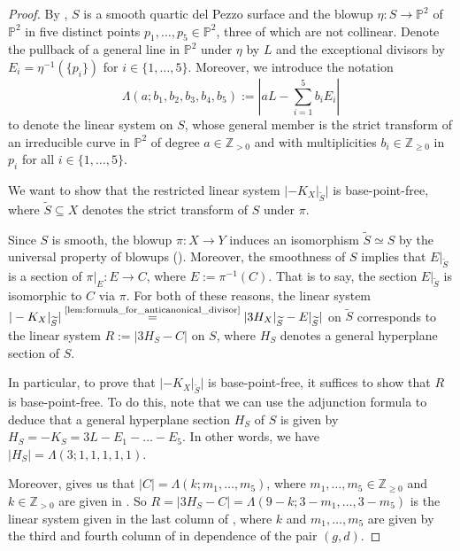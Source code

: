 \documentclass[english,11pt,reqno]{amsart}
\newcommand{\sub}{\subseteq}
\newcommand{\Ptwo}{\mathbb{P}^2}
\newcommand{\Z}{\mathbb{Z}}
\begin{document}
\begin{proof}
By , $S$ is a smooth quartic del Pezzo surface and the blowup $\eta:S\rightarrow \Ptwo$ of $\Ptwo$ in five distinct points $p_1,\dots,p_5\in \Ptwo$, three of which are not collinear. Denote the pullback of a general line in $\Ptwo$ under $\eta$ by $L$ and the exceptional divisors by $E_i=\eta^{-1}(\{p_i\})$ for $i\in \{1,\dots,5\}$.
Moreover, we introduce the notation 
$$\Lambda(a;b_1,b_2,b_3,b_4,b_5):=\left|aL-\sum_{i=1}^5 b_i E_i\right|$$ to denote the linear system on $S$, whose general member is the strict transform of an irreducible curve in $\Ptwo$ of degree $a\in \Z_{>0}$ and with multiplicities $b_i\in\Z_{\geq0}$ in $p_i$ for all $i\in\{1,\dots,5\}$. \par 
%
%
We want to show that the restricted linear system $|-K_X|_{\widetilde{S}}|$ is base-point-free, where $\widetilde{S}\sub X$ denotes the strict transform of $S$ under $\pi$. \par 
Since $S$ is smooth, the blowup $\pi:X\rightarrow Y$ induces an isomorphism $\widetilde{S}\simeq S$ by the universal property of blowups (). Moreover, the smoothness of $S$ implies that $E|_{\widetilde{S}}$ is a section of $\pi|_E:E\rightarrow C$, where $E:=\pi^{-1}(C)$. That is to say, the section $E|_{\widetilde{S}}$ is isomorphic to $C$ via $\pi$. For both of these reasons, the linear system $|-K_X|_{\widetilde{S}}|\overset{\textup{\ref{lem:formula_for_anticanonical_divisor}}}{=}|3H_X|_{\widetilde{S}}- E|_{\widetilde{S}}|$ on $\widetilde{S}$ corresponds to the linear system $R:= |3H_S-C|$ on $S$, where $H_S$ denotes a general hyperplane section of $S$. \par 
In particular, to prove that $|-K_X|_{\widetilde{S}}|$ is base-point-free, it suffices to show that $R$ is base-point-free. To do this, note that we can use the adjunction formula to deduce that a general hyperplane section $H_S$ of $S$ is given by $H_S=-K_S=3L-E_1-{\dots}-E_5$. In other words, we have $|H_S| = \Lambda(3;1,1,1,1,1)$. \par 
Moreover,  gives us that $|C|=\Lambda(k;m_1,\dots,m_5)$, where $m_1,\dots,m_5\in\Z_{\geq 0}$ and $k\in \Z_{>0}$ are given in . So $R=|3H_S - C| =\Lambda(9-k;3-m_1,\dots,3-m_5)$ is the linear system given in the last column of , where $k$ and $m_1,\dots,m_5$ are given by the third and fourth column of  in dependence of the pair $(g,d)$.\par

\end{proof}
\end{document}
